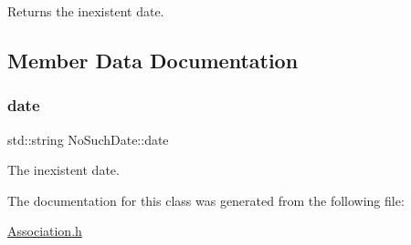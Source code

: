 Returns the inexistent date. 



\subsection{Member Data Documentation}
\mbox{\label{classNoSuchDate_af3b260da65ff8089d325b948e895f6b3}} 
\subsubsection{\texorpdfstring{date}{date}}
{\footnotesize\ttfamily std\+::string No\+Such\+Date\+::date\hspace{0.3cm}{\ttfamily [private]}}



The inexistent date. 



The documentation for this class was generated from the following file\+:\begin{DoxyCompactItemize}
\item 
\mbox{\hyperlink{Association_8h}{Association.\+h}}\end{DoxyCompactItemize}
